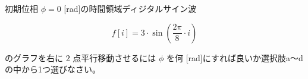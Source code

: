 初期位相 $\phi = 0$ [rad]の時間領域ディジタルサイン波 

\[
f[i] = 3 \cdot \sin \left ( \frac{2 \pi}{8}  \cdot i \right )
\]

\noindent のグラフを右に $2$ 点平行移動させるには $\phi$ を何 [rad]にすれば良いか選択肢a〜dの中から1つ選びなさい。
